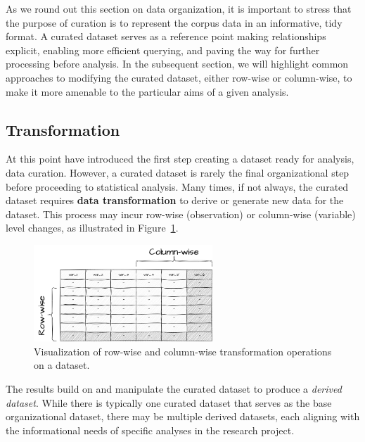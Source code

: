 \documentclass[
  letterpaper,
  DIV=11,
  numbers=noendperiod]{scrreport}
\theoremstyle{definition}
\theoremstyle{remark}
\begin{document}
As we round out this section on data organization, it is important to
stress that the purpose of curation is to represent the corpus data in
an informative, tidy format. A curated dataset serves as a reference
point making relationships explicit, enabling more efficient querying,
and paving the way for further processing before analysis. In the
subsequent section, we will highlight common approaches to modifying the
curated dataset, either row-wise or column-wise, to make it more
amenable to the particular aims of a given analysis.

\hypertarget{sec-ud-transformation}{%
\subsection{Transformation}\label{sec-ud-transformation}}

At this point have introduced the first step creating a dataset ready
for analysis, data curation. However, a curated dataset is rarely the
final organizational step before proceeding to statistical analysis.
Many times, if not always, the curated dataset requires \textbf{data
transformation} to derive or generate new data for the dataset. This
process may incur row-wise (observation) or column-wise (variable) level
changes, as illustrated in Figure~\ref{fig-ud-transformations}.

\begin{figure}[H]

{\centering \includegraphics[width=2.65in,height=\textheight]{figures/ud-transformations.drawio.png}

}

\caption{\label{fig-ud-transformations}Visualization of row-wise and
column-wise transformation operations on a dataset.}

\end{figure}

The results build on and manipulate the curated dataset to produce a
\emph{derived dataset}. While there is typically one curated dataset
that serves as the base organizational dataset, there may be multiple
derived datasets, each aligning with the informational needs of specific
analyses in the research project.
\end{document}
